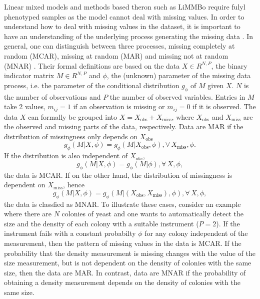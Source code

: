 Linear mixed models and methods based theron such as LiMMBo require fulyl phenotyped samples as the model cannot deal with missing values. In order to understand how to deal with missing values in the dataset, it is important to have an understanding of the underlying process generating the missing data \citep{Rubin1976}. In general, one can distinguish between three processes, missing completely at random (MCAR), missing at random (MAR) and missing not at random (MNAR) \citep{Rubin2002}. Their formal definitions are based on the data \(X  \in R^{N,P}\),  the binary indicator matrix \(M  \in R^{N,P}\)  and \(\phi\), the (unknown) parameter of the missing data process, i.e. the parameter of the conditional distribution \(g_\phi\) of \(M\) given \(X\). \(N\) is the number of observations and \(P\) the number of observed variables. Entries in \(M\) take \num{2} values,  \(m_{ij} = 1 \) if an observation is missing or  \(m_{ij} = 0\) if it is observed. The data \(X\) can formally be grouped into \(X=X_\text{obs} + X_\text{miss}\), where \(X_\text{obs}\) and  \(X_\text{miss}\) are the observed and missing parts of the data, respectively. Data are MAR if the distribution of missingness only depends on \(X_{\text{obs}}\)
\begin{equation}
g_\phi(M | X, \phi) =  g_\phi(M | X_{\text{obs}}, \phi),  \forall \, X_\text{miss}, \phi.
\end{equation}
If the distribution is also independent of \(X_{obs}\), 
\begin{equation}
g_\phi(M | X, \phi) =  g_\phi(M | \phi), \forall \, X, \phi,
\end{equation}
the data is MCAR. If on the other hand, the distribution of missingness is dependent on \(X_{\text{miss}}\), hence
\begin{equation}
g_\phi(M | X, \phi) =  g_\phi(M | (X_{\text{obs}}, X_{\text{miss}}),\phi), \forall \, X, \phi,
\end{equation}
the data is classfied as MNAR. To illustrate these cases, consider an example where there are \(N\) colonies of yeast and one wants to automatically detect the size and the density of each colony with a suitable instrument (\(P=2\)). If the instrument fails with a constant probabilty \(\phi\) for any colony independent of the measurement, then the pattern of missing values in the data is MCAR. If the probability that the density measurement is missing changes with the value of the size measurement, but is not dependent on the density of colonies with the same size, then the data are MAR. In contrast, data are MNAR if the probability of obtaining a density measurement depends on the density of colonies with the same size. 

